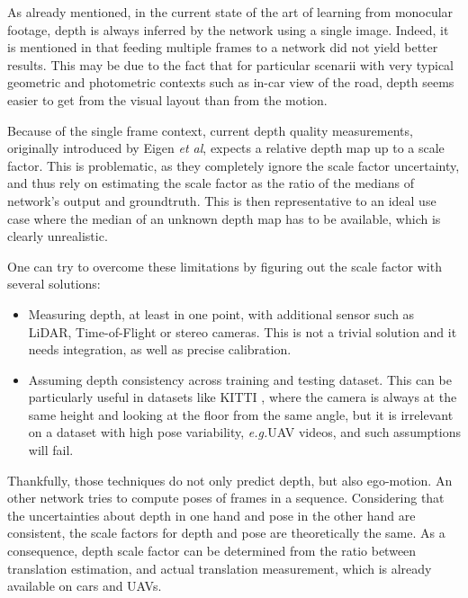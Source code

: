 \documentclass[runningheads]{llncs}
\def\eg{\emph{e.g.}\:}
\def\etal{\emph{et al}\:}
\begin{document}
\label{section:critic}
As already mentioned, in the current state of the art
of
learning from monocular footage, depth is always inferred by the network using a single image. Indeed, it is mentioned in \cite{zhou2017unsupervised} that feeding multiple frames to a network did not yield better results. This may be due to the fact that for particular scenarii with very
typical geometric and photometric contexts
such as in-car view of the road, depth seems easier to get from the
visual layout
than from the motion.

Because of the single frame context, current depth quality measurements, originally introduced by Eigen \etal \cite{eigen2014depth}, expects a relative depth map up to a scale factor. This is problematic, as they completely ignore the scale factor uncertainty, and thus rely on
estimating the scale factor as
the ratio of the medians of network's output and groundtruth. This is then representative to an ideal use case where the median of an unknown depth map has to be available, which is clearly unrealistic.

One can try to overcome these limitations by figuring out the scale factor with several solutions:
\begin{itemize}
\item Measuring depth, at least in one point, with additional sensor such as LiDAR,
Time-of-Flight
or stereo cameras. This is not a trivial solution and it needs integration, as
well
as precise calibration.

\item Assuming depth consistency across training and testing dataset. This can be particularly useful in datasets like KITTI \cite{geiger2013vision}, where the camera is always at the same height and looking at the floor
from
the same angle, but it
is irrelevant on a dataset with high pose variability,
\eg UAV videos, and such assumptions will fail.
\end{itemize}

Thankfully, those techniques
do
not only predict depth, but also ego-motion. An other network tries to compute poses of frames in a sequence. Considering that the
uncertainties
about depth in one hand and pose in the other hand are consistent, the scale factors for depth and pose are theoretically the same.
As a consequence, depth scale factor can be determined from the ratio between translation estimation, and actual translation measurement, which is already available on cars and UAVs.
\end{document}
